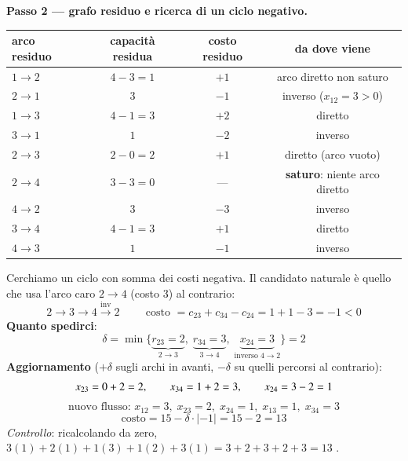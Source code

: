 \documentclass[12pt]{extarticle} %
\begin{document}
\noindent\textbf{Passo 2 --- grafo residuo e ricerca di un ciclo negativo.}
\begin{center}
\begin{tabular}{lccc}
\hline
\textbf{arco residuo} & \textbf{capacità residua} & \textbf{costo residuo} & \textbf{da dove viene} \\
\hline
$1\to2$ & $4-3 = 1$ & $+1$ & arco diretto non saturo \\
$2\to1$ & $3$ & $-1$ & inverso ($x_{12}=3>0$) \\
$1\to3$ & $4-1 = 3$ & $+2$ & diretto \\
$3\to1$ & $1$ & $-2$ & inverso \\
$2\to3$ & $2-0 = 2$ & $+1$ & diretto (arco vuoto) \\
$2\to4$ & $3-3 = 0$ & --- & \textbf{saturo}: niente arco diretto \\
$4\to2$ & $3$ & $-3$ & inverso \\
$3\to4$ & $4-1 = 3$ & $+1$ & diretto \\
$4\to3$ & $1$ & $-1$ & inverso \\
\hline
\end{tabular}
\end{center}
Cerchiamo un ciclo con somma dei costi negativa. Il candidato naturale è quello che usa l'arco caro $2\to4$ (costo 3) al contrario:
\[
2 \to 3 \to 4 \xrightarrow{\text{inv}} 2 \hspace{1cm}\text{costo } = c_{23} + c_{34} - c_{24} = 1 + 1 - 3 = -1 < 0
\]
\textbf{Quanto spedirci}:
\[
\delta = \min\{\underbrace{r_{23} = 2}_{2\to3},\; \underbrace{r_{34} = 3}_{3\to4},\; \underbrace{x_{24} = 3}_{\text{inverso } 4\to2}\} = 2
\]
\textbf{Aggiornamento} ($+\delta$ sugli archi in avanti, $-\delta$ su quelli percorsi al contrario):
\[
x_{23} = 0+2 = 2, \hspace{0.7cm} x_{34} = 1+2 = 3, \hspace{0.7cm} x_{24} = 3-2 = 1
\]
\[
\text{nuovo flusso: } x_{12}=3,\; x_{23}=2,\; x_{24}=1,\; x_{13}=1,\; x_{34}=3
\]
\[
\text{costo} = 15 - \delta \cdot |{-1}| = 15 - 2 = 13
\]
\textit{Controllo}: ricalcolando da zero, $3(1)+2(1)+1(3)+1(2)+3(1) = 3+2+3+2+3 = 13$ \checkmark.
\begin{center}
\end{center}
\end{document}
